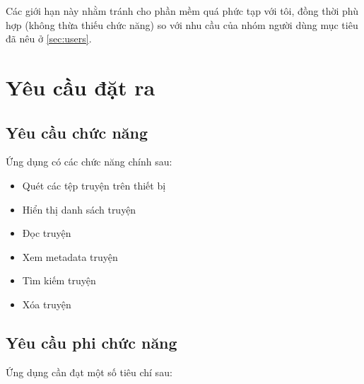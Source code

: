\documentclass[../../thesis]{subfiles}
\begin{document}
Các giới hạn này nhằm tránh cho phần mềm quá phức tạp với tôi, đồng thời phù hợp
(không thừa thiếu chức năng) so với nhu cầu của nhóm người dùng mục tiêu đã nêu
ở \autoref{sec:users}.



\section{Yêu cầu đặt ra}\label{sec:requirements}

\subsection{Yêu cầu chức năng}\label{sec:functional-requirements}

Ứng dụng có các chức năng chính sau:

\begin{itemize}
    \item
        Quét các tệp truyện trên thiết bị
    \item
        Hiển thị danh sách truyện
    \item
        Đọc truyện
    \item
        Xem metadata truyện
    \item
        Tìm kiếm truyện
    \item
        Xóa truyện
\end{itemize}

\subsection{Yêu cầu phi chức năng}\label{sec:non-functional-requirements}

Ứng dụng cần đạt một số tiêu chí sau:
\end{document}

